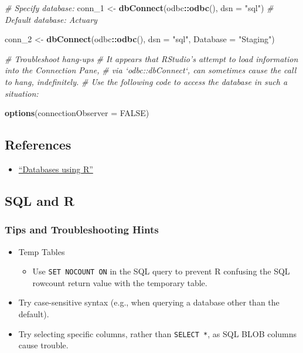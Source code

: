 \documentclass[
]{book}
\newenvironment{Shaded}{\begin{snugshade}}{\end{snugshade}}
\newcommand{\CommentTok}[1]{\textcolor[rgb]{0.56,0.35,0.01}{\textit{#1}}}
\newcommand{\DataTypeTok}[1]{\textcolor[rgb]{0.13,0.29,0.53}{#1}}
\newcommand{\DecValTok}[1]{\textcolor[rgb]{0.00,0.00,0.81}{#1}}
\newcommand{\KeywordTok}[1]{\textcolor[rgb]{0.13,0.29,0.53}{\textbf{#1}}}
\newcommand{\NormalTok}[1]{#1}
\newcommand{\OperatorTok}[1]{\textcolor[rgb]{0.81,0.36,0.00}{\textbf{#1}}}
\newcommand{\OtherTok}[1]{\textcolor[rgb]{0.56,0.35,0.01}{#1}}
\newcommand{\StringTok}[1]{\textcolor[rgb]{0.31,0.60,0.02}{#1}}
\providecommand{\tightlist}{%
  \setlength{\itemsep}{0pt}\setlength{\parskip}{0pt}}
\begin{document}
\begin{Shaded}
\begin{Highlighting}[]
\CommentTok{# Specify database:}
\NormalTok{conn_}\DecValTok{1}\NormalTok{ <-}\StringTok{ }\KeywordTok{dbConnect}\NormalTok{(odbc}\OperatorTok{::}\KeywordTok{odbc}\NormalTok{(), }\DataTypeTok{dsn =} \StringTok{"sql"}\NormalTok{) }\CommentTok{# Default database: Actuary}

\NormalTok{conn_}\DecValTok{2}\NormalTok{ <-}\StringTok{ }\KeywordTok{dbConnect}\NormalTok{(odbc}\OperatorTok{::}\KeywordTok{odbc}\NormalTok{(), }\DataTypeTok{dsn =} \StringTok{"sql"}\NormalTok{, }\DataTypeTok{Database =} \StringTok{"Staging"}\NormalTok{)}

\CommentTok{# Troubleshoot hang-ups}
\CommentTok{# It appears that RStudio's attempt to load information into the Connection Pane,}
\CommentTok{# via `odbc::dbConnect`, can sometimes cause the call to hang, indefinitely.}
\CommentTok{# Use the following code to access the database in such a situation:}

\KeywordTok{options}\NormalTok{(}\DataTypeTok{connectionObserver =} \OtherTok{FALSE}\NormalTok{)}
\end{Highlighting}
\end{Shaded}

\hypertarget{references}{%
\subsection{References}\label{references}}

\begin{itemize}
\tightlist
\item
  \href{db.rstudio.com}{``Databases using R''}
\end{itemize}

\hypertarget{sql-and-r}{%
\subsection{SQL and R}\label{sql-and-r}}

\hypertarget{tips-and-troubleshooting-hints}{%
\subsubsection{Tips and Troubleshooting Hints}\label{tips-and-troubleshooting-hints}}

\begin{itemize}
\tightlist
\item
  Temp Tables

  \begin{itemize}
  \tightlist
  \item
    Use \texttt{SET\ NOCOUNT\ ON} in the SQL query to prevent R confusing the SQL rowcount return value with the temporary table.
  \end{itemize}
\item
  Try case-sensitive syntax (e.g., when querying a database other than the default).
\item
  Try selecting specific columns, rather than \texttt{SELECT\ *}, as SQL BLOB columns cause trouble.
\end{itemize}
\end{document}
